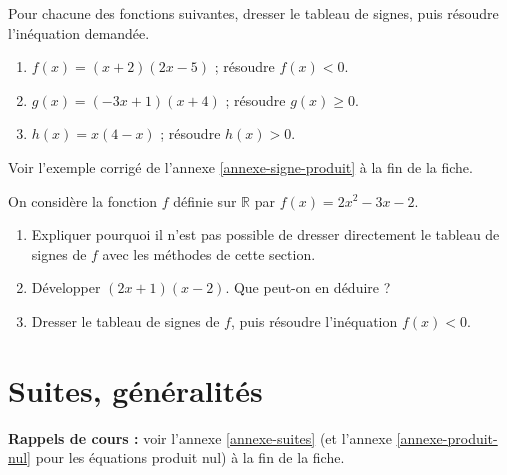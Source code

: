 \documentclass[10pt,a4paper]{article}
\begin{document}
\begin{bloc}
\begin{exo}
Pour chacune des fonctions suivantes, dresser le tableau de signes, puis résoudre l'inéquation demandée.
\begin{enumerate}[leftmargin=*]
    \item \(f(x)=(x+2)(2x-5)\) ; résoudre \(f(x)<0\).
    \item \(g(x)=(-3x+1)(x+4)\) ; résoudre \(g(x)\geq 0\).
    \item \(h(x)=x(4-x)\) ; résoudre \(h(x)>0\).
\end{enumerate}
\end{exo}

\begin{indication}
    Voir l'exemple corrigé de l'annexe \ref{annexe-signe-produit} à la fin de la fiche.
\end{indication}
\end{bloc}

\begin{bloc}
\begin{exo}[][appro]
On considère la fonction \(f\) définie sur \(\mathbb{R}\) par \(f(x)=2x^2-3x-2\).
\begin{enumerate}[leftmargin=*]
    \item Expliquer pourquoi il n'est pas possible de dresser directement le tableau de signes de \(f\) avec les méthodes de cette section.
    \item Développer \((2x+1)(x-2)\). Que peut-on en déduire ?
    \item Dresser le tableau de signes de \(f\), puis résoudre l'inéquation \(f(x)<0\).
\end{enumerate}
\end{exo}
\end{bloc}


\section{Suites, généralités}

\textbf{Rappels de cours :} voir l'annexe \ref{annexe-suites} (et l'annexe \ref{annexe-produit-nul} pour les équations produit nul) à la fin de la fiche.
\nopagebreak
\end{document}
